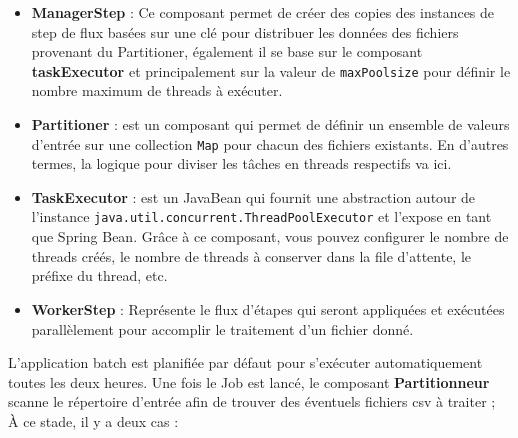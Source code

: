 \begin{itemize}
    \item \textbf{ManagerStep} : Ce composant permet de créer des copies des instances de step de flux basées sur une clé pour distribuer les données des fichiers provenant du Partitioner, également il se base sur le composant \textbf{taskExecutor} et principalement sur la valeur de \lstinline|maxPoolsize| pour définir le nombre maximum de threads à exécuter.
    \item \textbf{Partitioner} : est un composant qui permet de définir un ensemble de valeurs d'entrée sur une collection \lstinline|Map| pour chacun des fichiers existants. En d'autres termes, la logique pour diviser les tâches en threads respectifs va ici.
    \item \textbf{TaskExecutor} : est un JavaBean qui fournit une abstraction autour de l'instance \lstinline|java.util.concurrent.ThreadPoolExecutor| et l'expose en tant que Spring Bean. Grâce à ce composant, vous pouvez configurer le nombre de threads créés, le nombre de threads à conserver dans la file d'attente, le préfixe du thread, etc.
    \item \textbf{WorkerStep} : Représente le flux d'étapes qui seront appliquées et exécutées parallèlement pour accomplir le traitement d'un fichier donné.\\
\end{itemize}
\clearpage
{}
L'application batch est planifiée par défaut pour s'exécuter automatiquement toutes les deux heures. Une fois le Job est lancé, le composant \textbf{Partitionneur} scanne le répertoire d'entrée afin de trouver des éventuels fichiers csv à traiter ;\\
À ce stade, il y a deux cas :

